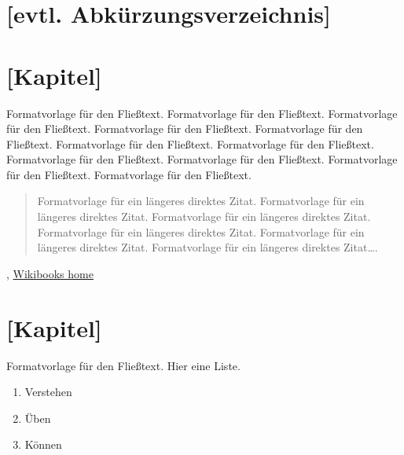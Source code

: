 \documentclass[a4paper,12pt,twoside]{scrreprt}
\begin{document}
\clearpage
{}
{}
\listoftables

\clearpage
{}
{}  %
\chapter*{[evtl. Abkürzungsverzeichnis]} %
\begin{acronym}[SQL]
\end{acronym}


\chapter{[Kapitel]}
Formatvorlage für den Fließtext. Formatvorlage für den Fließtext. Formatvorlage für den Fließtext. Formatvorlage für den Fließtext. Formatvorlage für den Fließtext. Formatvorlage für den Fließtext. Formatvorlage für den Fließtext. Formatvorlage für den Fließtext. Formatvorlage für den Fließtext. Formatvorlage für den Fließtext. Formatvorlage für den Fließtext.
\begin{quote}
  Formatvorlage für ein längeres direktes Zitat. Formatvorlage für ein längeres direktes Zitat. Formatvorlage für ein längeres direktes Zitat. Formatvorlage für ein längeres direktes Zitat. Formatvorlage für ein längeres direktes Zitat. Formatvorlage für ein längeres direktes Zitat….
\end{quote}

, \href{https://www.wikibooks.org}{Wikibooks home}

\chapter{[Kapitel]}
Formatvorlage für den Fließtext.
Hier eine Liste.
\begin{enumerate}
 \item Verstehen
 \item Üben
 \item Können
\end{enumerate}
\end{document}
